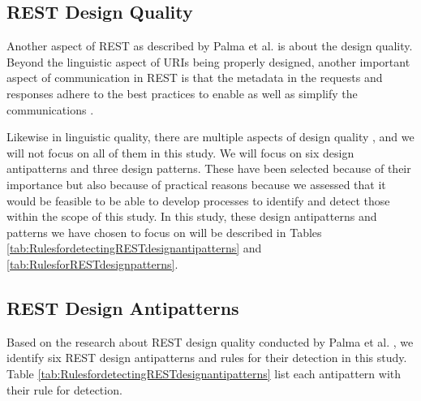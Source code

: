 \subsection{REST Design Quality}

Another aspect of REST as described by Palma et al. is about the design quality. Beyond the linguistic aspect of URIs being properly designed, another important aspect of communication in REST is that the metadata in the requests and responses adhere to the best practices to enable as well as simplify the communications \cite{restdissertation}\cite{design}.

Likewise in linguistic quality, there are multiple aspects of design quality \cite{design}, and we will not focus on all of them in this study. We will focus on six design antipatterns and three design patterns. These have been selected because of their importance but also because of practical reasons because we assessed that it would be feasible to be able to develop processes to identify and detect those within the scope of this study. In this study, these design antipatterns and patterns we have chosen to focus on will be described in Tables \ref{tab:RulesfordetectingRESTdesignantipatterns} and \ref{tab:RulesforRESTdesignpatterns}. 

\subsection{REST Design Antipatterns}
\label{desidnAntipatterns}

Based on the research about REST design quality conducted by Palma et al. \cite{design}, we identify six REST design antipatterns and rules for their detection in this study. Table \ref{tab:RulesfordetectingRESTdesignantipatterns} list each antipattern with their rule for detection.

